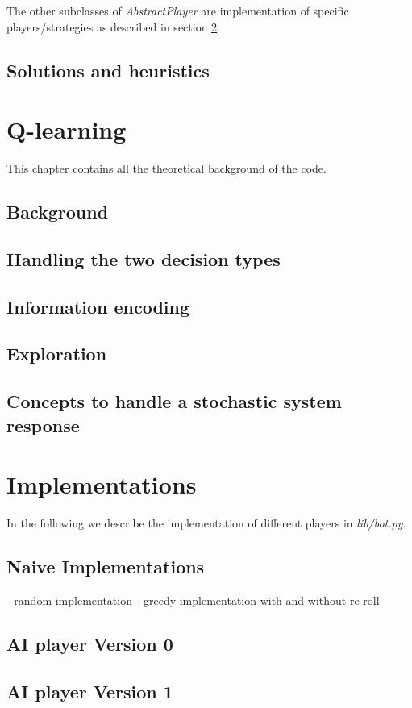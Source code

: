 \documentclass{article}
\begin{document}
The other subclasses of \emph{AbstractPlayer} are implementation of 
specific players/strategies as described in section \ref{sec_impl}.

\subsection{Solutions and heuristics}


\section{Q-learning}
This chapter contains all the theoretical background of the code.
\subsection{Background}
\subsection{Handling the two decision types}
\subsection{Information encoding}
\subsection{Exploration}
\subsection{Concepts to handle a stochastic system response}

\section{Implementations}
\label{sec_impl}
In the following we describe the implementation of different players in \emph{lib/bot.py}.

\subsection{Naive Implementations}
- random implementation
- greedy implementation with and without re-roll
\subsection{AI player Version 0}
\subsection{AI player Version 1}
\end{document}
